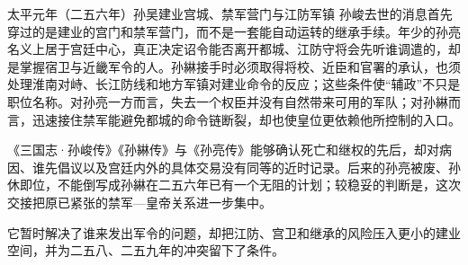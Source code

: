 \begin{event}{}{太平元年（二五六年）}{孙吴}{建业宫城、禁军营门与江防军镇}
孙峻去世的消息首先穿过的是建业的宫门和禁军营门，而不是一套能自动运转的继承手续。年少的孙亮名义上居于宫廷中心，真正决定诏令能否离开都城、江防守将会先听谁调遣的，却是掌握宿卫与近畿军令的人。孙綝接手时必须取得将校、近臣和官署的承认，也须处理淮南对峙、长江防线和地方军镇对建业命令的反应；这些条件使“辅政”不只是职位名称。对孙亮一方而言，失去一个权臣并没有自然带来可用的军队；对孙綝而言，迅速接住禁军能避免都城的命令链断裂，却也使皇位更依赖他所控制的入口。

\begin{sourcenote}
《三国志·孙峻传》《孙綝传》与《孙亮传》能够确认死亡和继权的先后，却对病因、谁先倡议以及宫廷内外的具体交易没有同等的近时记录。后来的孙亮被废、孙休即位，不能倒写成孙綝在二五六年已有一个无阻的计划；较稳妥的判断是，这次交接把原已紧张的禁军—皇帝关系进一步集中。
\end{sourcenote}
它暂时解决了谁来发出军令的问题，却把江防、宫卫和继承的风险压入更小的建业空间，并为二五八、二五九年的冲突留下了条件。
\end{event}